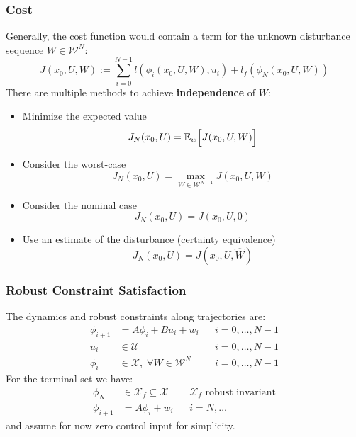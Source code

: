 \subsubsection{Cost}
Generally, the cost function would contain a term for the unknown disturbance sequence $W\in \mathcal{W}^{N}$:
\begin{equation*}
    J(x_0, U, W) := \sum_{i=0}^{N-1} l(\phi_i(x_0, U, W), u_i) + l_f(\phi_N(x_0, U, W))
\end{equation*}
\newpar{}
There are multiple methods to achieve \textbf{independence} of $W$:
\begin{itemize}
    \item Minimize the expected value
          \begin{equation*}
              J_N(x_0, U) = \mathbb{E}_w \Bigl[J(x_0, U, W)\Bigr]
          \end{equation*}
    \item Consider the worst-case
          \begin{equation*}
              J_N(x_0, U) = \max_{W\in \mathcal{W}^{N-1}} J(x_0, U, W)
          \end{equation*}
    \item Consider the nominal case
          \begin{equation*}
              J_N(x_0, U) = J(x_0, U, 0)
          \end{equation*}
    \item Use an estimate of the disturbance (certainty equivalence)
          \begin{equation*}
              J_N(x_0, U) = J(x_0, U, \widehat{W})
          \end{equation*}
\end{itemize}

\subsubsection{Robust Constraint Satisfaction}\label{ssec:robust_constraint_satisfaction}
The dynamics and robust constraints along trajectories are:
\begin{align*}
    \phi_{i+1} & = A\phi_{i} + Bu_{i} + w_{i}                  &  & i = 0,\ldots, N-1 \\
    u_i        & \in \mathcal{U}                               &  & i = 0,\ldots, N-1 \\
    \phi_{i}   & \in \mathcal{X},\; \forall W\in \mathcal{W}^N &  & i = 0,\ldots, N-1
\end{align*}
For the terminal set we have:
\begin{align*}
    \phi_{N}   & \in \mathcal{X}_f \subseteq \mathcal{X} &  & \mathcal{X}_f \text{ robust invariant} \\
    \phi_{i+1} & = A\phi_{i} + w_{i}                     &  & i = N, \ldots
\end{align*}
and assume for now zero control input for simplicity.

